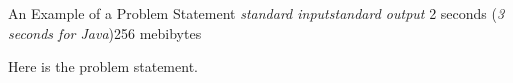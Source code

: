 \begin{problem}{An Example of a Problem Statement}
{\textsl{standard input}}{\textsl{standard output}}
{2 seconds (\textsl{3 seconds for Java})}{256 mebibytes}{}

Here is the problem statement.

\InputFile



\OutputFile


\Examples

\begin{example}
%
\end{example}

\begin{examplewide}
%
\end{examplewide}

\begin{examplethree}
%
\end{examplethree}


\end{problem}
